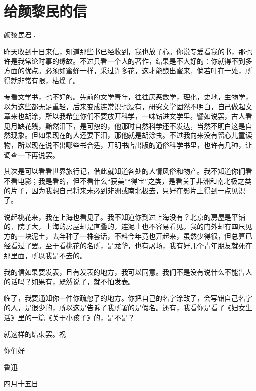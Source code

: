\documentclass[12pt,UTF-8,openany]{ctexbook}
\begin{document}
\chapter{给颜黎民的信}

\begin{large}
    
    \noindent 颜黎民君：
    
    \vspace{24pt}
    
    昨天收到十日来信，知道那些书已经收到，我也放了心。你说专爱看我的书，那也许是我常论时事的缘故。不过只看一个人的著作，结果是不大好的：你就得不到多方面的优点。必须如蜜蜂一样，采过许多花，这才能酿出蜜来，倘若叮在一处，所得就非常有限，枯燥了。
    
    专看文学书，也不好的。先前的文学青年，往往厌恶数学，理化，史地，生物学，以为这些都无足重轻，后来变成连常识也没有，研究文学固然不明白，自己做起文章来也胡涂，所以我希望你们不要放开科学，一味钻进文学里。譬如说罢，古人看见月缺花残，黯然泪下，是可恕的，他那时自然科学还不发达，当然不明白这是自然现象。但如果现在的人还要下泪，那他就是胡涂虫。不过我向来没有留心儿童读物，所以现在说不出哪些书合适，开明书店出版的通俗科学书里，也许有几种，让调查一下再说罢。
    
    其次是可以看看世界旅行记，借此就知道各处的人情风俗和物产。我不知道你们看不看电影；我是看的，但不看什么“获美”“得宝”之类，是看关于非洲和南北极之类的片子，因为我想自己将来未必到非洲或南北极去，只好在影片上得到一点见识了。
    
    说起桃花来，我在上海也看见了。我不知道你到过上海没有？北京的房屋是平铺的，院子大，上海的房屋却是直叠的，连泥土也不容易看见。我的门外却有四尺见方的一块泥土，去年种了一株套话，不料今年竟也开起来，虽然少得很，但总算已经看过了罢。至于看桃花的名所，是龙华，也有屠场，我有好几个青年朋友就死在那里面，所以我是不去的。
    
    我的信如果要发表，且有发表的地方，我可以同意。我们不是没有说什么不能告人的话吗？如果有，既然说了，就不怕发表。
    
    临了，我要通知你一件你疏忽了的地方。你把自己的名字涂改了，会写错自己名字的人，是很少的，所以这是告诉了我所署的是假名。还有，我看你是看了《妇女生活》里的一篇《关于小孩子》的，是不是？
    
    就这样的结束罢。祝
    
    你们好
    
    \vspace{36pt}
    
    \begin{flushright}
        鲁迅
        
        四月十五日
        
    \end{flushright}
    
    
    
\end{large}
\end{document}
